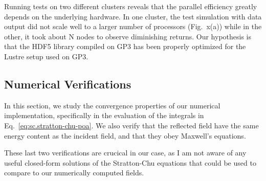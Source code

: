 \documentclass[11pt,SymmetricalJury]{inrsthesis/inrsthesis}
\begin{document}
Running tests on two different clusters reveals that the parallel efficiency
greatly depends on the underlying hardware. In one cluster, the test simulation
with data output did not scale well to a larger number of processors (Fig.~x(a))
while in the other, it took about N nodes to observe diminishing returns. Our
hypothesis is that the HDF5 library compiled on GP3 has been properly optimized
for the Lustre setup used on GP3.

\subsection{Numerical Verifications}

In this section, we study the convergence properties of our numerical implementation,
specifically in the evaluation of the integrals in Eq.~\eqref{eq:sc.stratton-chu-poa}.
We also verify that the reflected field have the same energy content as the incident
field, and that they obey Maxwell's equations.

These last two verifications are crucical in our case, as I am not aware of any
useful closed-form solutions of the Stratton-Chu equations that could be used
to compare to our numerically computed fields.
\end{document}

